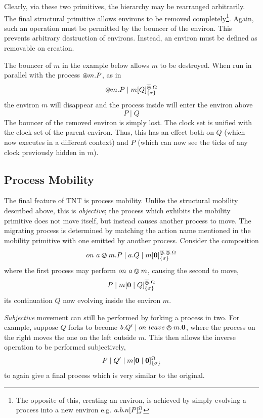 \documentclass{acm_proc_article-sp}
\begin{document}
Clearly, via these two primitives, the hierarchy may be rearranged
arbitrarily.  The final structural primitive allows environs to be
removed completely\footnote{The opposite of this, creating an environ,
is achieved by simply evolving a process into a new environ
e.g. $a.b.{n}[ P ]^{\Omega}_{\sigma}$}.  Again, such an operation must
be permitted by the bouncer of the environ.  This prevents arbitrary
destruction of environs.  Instead, an environ must be defined as
removable on creation.

The bouncer of $m$ in the example below allows $m$ to be destroyed.
When run in parallel with the process $\varoast m.P$, as in
\begin{displaymath}
\varoast m.P \mid {m}[ Q ]^{\overline{\varoast}.\Omega}_{\{\sigma\}}
\end{displaymath}
the environ $m$ will disappear and the process inside will enter the
environ above
\begin{displaymath}
P \mid Q
\end{displaymath}
The bouncer of the removed environ is simply lost.  The clock set is
unified with the clock set of the parent environ.  Thus, this has an
effect both on $Q$ (which now executes in a different context) and $P$
(which can now see the ticks of any clock previously hidden in $m$).

\subsection{Process Mobility}
\label{procmob}

The final feature of TNT is process mobility. Unlike the structural
mobility described above, this is \emph{objective}; the process which
exhibits the mobility primitive does not move itself, but instead causes
another process to move.  The migrating process is determined by
matching the action name mentioned in the mobility primitive with one
emitted by another process.  Consider the composition
\begin{displaymath}
  on\ a \varovee m.P \mid a.Q \mid {m}[ \textbf{0} ]^{\overline{\varovee}.\overline{\varowedge}.\Omega}_{\{\sigma\}}
\end{displaymath}
where the first process may perform $on\ a \varovee m$, causing the second
to move,
\begin{displaymath}
P \mid {m}[ \textbf{0} \mid Q ]^{\overline{\varowedge}.\Omega}_{\{\sigma\}}
\end{displaymath}
its continuation $Q$ now evolving inside the environ $m$.

\emph{Subjective} movement can still be performed by forking a process
in two. For example, suppose $Q$ forks to become $b.Q' \mid
on\ leave \varowedge m.\textbf{0}$, where the process on the right moves the one
on the left outside $m$. This then allows the inverse operation to be
performed subjectively,
\begin{displaymath}
P \mid Q' \mid {m}[ \textbf{0} \mid \textbf{0} ]^{\Omega}_{\{\sigma\}}
\end{displaymath}
to again give a final process which is very similar to the original.
\end{document}
